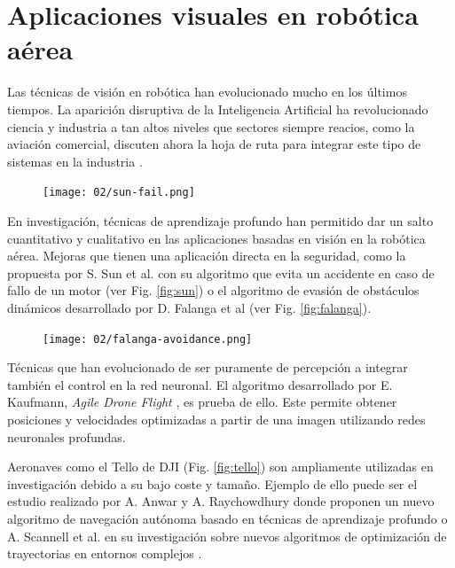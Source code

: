 \documentclass[../main.tex]{subfiles}
\begin{document}
\section{Aplicaciones visuales en robótica aérea}
Las técnicas de visión en robótica han evolucionado mucho en los últimos tiempos. La aparición disruptiva de la Inteligencia Artificial ha revolucionado ciencia y industria a tan altos niveles que sectores siempre reacios, como la aviación comercial, discuten ahora la hoja de ruta para integrar este tipo de sistemas en la industria \cite{easa-roadmap}.

\begin{figure}[ht]
 	{\texttt{[image: 02/sun-fail.png]}}
\end{figure}

En investigación, técnicas de aprendizaje profundo han permitido dar un salto cuantitativo y cualitativo en las aplicaciones basadas en visión en la robótica aérea. Mejoras que tienen una aplicación directa en la seguridad, como la propuesta por S. Sun et al. con su algoritmo que evita un accidente en caso de fallo de un motor \cite{sun2021autonomous} (ver Fig. \ref{fig:sun}) o el algoritmo de evasión de obstáculos dinámicos desarrollado por D. Falanga et al \cite{falanga2020dynamic} (ver Fig. \ref{fig:falanga}).

\begin{figure}[ht]
 	{\texttt{[image: 02/falanga-avoidance.png]}}
\end{figure}

Técnicas que han evolucionado de ser puramente de percepción a integrar también el control en la red neuronal. El algoritmo desarrollado por E. Kaufmann, \emph{Agile Drone Flight} \cite{kaufmann2018deep}, es prueba de ello. Este permite obtener posiciones y velocidades optimizadas a partir de una imagen utilizando redes neuronales profundas.  

Aeronaves como el Tello de DJI (Fig. \ref{fig:tello}) son ampliamente utilizadas en investigación debido a su bajo coste y tamaño. Ejemplo de ello puede ser el estudio realizado por A. Anwar y A. Raychowdhury donde proponen un nuevo algoritmo de navegación autónoma basado en técnicas de aprendizaje profundo \cite{anwar2020autonomous} o A. Scannell et al. en su investigación sobre nuevos algoritmos de optimización de trayectorias en entornos complejos \cite{scannell2021trajectory}.




\end{document}
